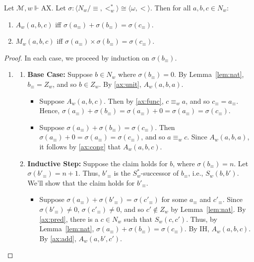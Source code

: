 \documentclass[10pt,a4paper]{amsart}
\newcommand{\Ax}{\text{AX}}
\newcommand{\tup}[1]{\langle #1 \rangle}
\begin{document}
\begin{lemma}
    Let $\mathcal{M},w \Vdash \Ax$. 
    Let $\sigma\colon \tup{N_w/\equiv,<_w^*} \cong \tup{\omega,<}$. 
    Then for all $a,b,c \in N_w$:
    \begin{enumerate}
        \item $A_w(a,b,c)$ iff $\sigma(a_\equiv) + \sigma(b_\equiv) = \sigma(c_\equiv)$.
        \item $M_w(a,b,c)$ iff $\sigma(a_\equiv) \times \sigma(b_\equiv) = \sigma(c_\equiv)$.
    \end{enumerate}
\end{lemma}

\begin{proof}
    In each case, we proceed by induction on $\sigma(b_\equiv)$.
    \begin{enumerate}
        \item 
        \begin{enumerate}[label=(\roman*)]
            \item \textbf{Base Case:} Suppose $b \in N_w$ where $\sigma(b_\equiv) = 0$. 
            By Lemma~\ref{lem:nat}, $b_\equiv = Z_w$, and so $b \in Z_w$. 
            By \ref{ax:unit}, $A_w(a,b,a)$. 
            \begin{itemize}
                \item[($\Rightarrow$)] Suppose $A_w(a,b,c)$. 
                Then by \ref{ax:func}, $c \equiv_w a$, and so $c_\equiv = a_\equiv$. 
                Hence, $\sigma(a_\equiv) + \sigma(b_\equiv) = \sigma(a_\equiv) + 0 = \sigma(a_\equiv) = \sigma(c_\equiv)$. 
                
                \item[($\Leftarrow$)] Suppose $\sigma(a_\equiv) + \sigma(b_\equiv) = \sigma(c_\equiv)$. 
                Then $\sigma(a_\equiv) + 0 = \sigma(a_\equiv) = \sigma(c_\equiv)$, and so $a \equiv_w c$. 
                Since $A_w(a,b,a)$, it follows by \ref{ax:cong} that $A_w(a,b,c)$. 
            \end{itemize}

            \item \textbf{Inductive Step:} Suppose the claim holds for $b$, where $\sigma(b_\equiv) = n$. 
            Let $\sigma(b'_\equiv) = n+1$. 
            Thus, $b'_\equiv$ is the $S_w^*$-successor of $b_\equiv$, i.e., $S_w(b,b')$. 
            We'll show that the claim holds for $b'_\equiv$. 
            \begin{itemize}
                \item[($\Leftarrow$)] Suppose $\sigma(a_\equiv) + \sigma(b'_\equiv) = \sigma(c'_\equiv)$ for some $a_\equiv$ and $c'_\equiv$. 
                Since $\sigma(b'_\equiv) \neq 0$, $\sigma(c'_\equiv) \neq 0$, and so $c' \notin Z_w$ by Lemma~\ref{lem:nat}. 
                By \ref{ax:pred}, there is a $c \in N_w$ such that $S_w(c,c')$. 
                Thus, by Lemma~\ref{lem:nat}, $\sigma(a_\equiv) + \sigma(b_\equiv) = \sigma(c_\equiv)$. 
                By IH, $A_w(a,b,c)$. 
                By \ref{ax:add}, $A_w(a,b',c')$. 
                

\end{itemize}
\end{enumerate}
\end{enumerate}
\end{proof}
\end{document}
